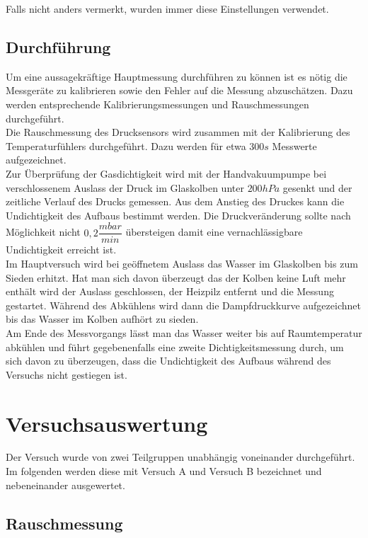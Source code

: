 \documentclass[12pt,a4paper]{article}
\begin{document}
Falls nicht anders vermerkt, wurden immer diese Einstellungen verwendet.

\subsection{Durchführung}

Um eine aussagekräftige Hauptmessung durchführen zu können ist es nötig die Messgeräte zu kalibrieren sowie den Fehler auf die Messung abzuschätzen. Dazu werden entsprechende Kalibrierungsmessungen und Rauschmessungen durchgeführt.\\

Die Rauschmessung des Drucksensors wird zusammen mit der Kalibrierung des Temperaturfühlers durchgeführt. Dazu werden für etwa $300s$ Messwerte aufgezeichnet.\\
Zur Überprüfung der Gasdichtigkeit wird mit der Handvakuumpumpe bei verschlossenem Auslass der Druck im Glaskolben unter $200hPa$ gesenkt und der zeitliche Verlauf des Drucks gemessen. Aus dem Anstieg des Druckes kann die Undichtigkeit des Aufbaus bestimmt werden. Die Druckveränderung sollte nach Möglichkeit nicht $0,2 \dfrac{mbar}{min}$ übersteigen damit eine vernachlässigbare Undichtigkeit erreicht ist. \\

Im Hauptversuch wird bei geöffnetem Auslass das Wasser im Glaskolben bis zum Sieden erhitzt. Hat man sich davon überzeugt das der Kolben keine Luft mehr enthält wird der Auslass geschlossen, der Heizpilz entfernt und die Messung gestartet. Während des Abkühlens wird dann die Dampfdruckkurve aufgezeichnet bis das Wasser im Kolben aufhört zu sieden.\\
Am Ende des Messvorgangs lässt man das Wasser weiter bis auf Raumtemperatur abkühlen und führt gegebenenfalls eine zweite Dichtigkeitsmessung durch, um sich davon zu überzeugen, dass die Undichtigkeit des Aufbaus während des Versuchs nicht gestiegen ist. 

\section{Versuchsauswertung}
Der Versuch wurde von zwei Teilgruppen unabhängig voneinander durchgeführt. Im folgenden werden diese mit \glqq Versuch A \grqq und \glqq Versuch B \grqq bezeichnet und nebeneinander ausgewertet.

\subsection{Rauschmessung}
\end{document}
